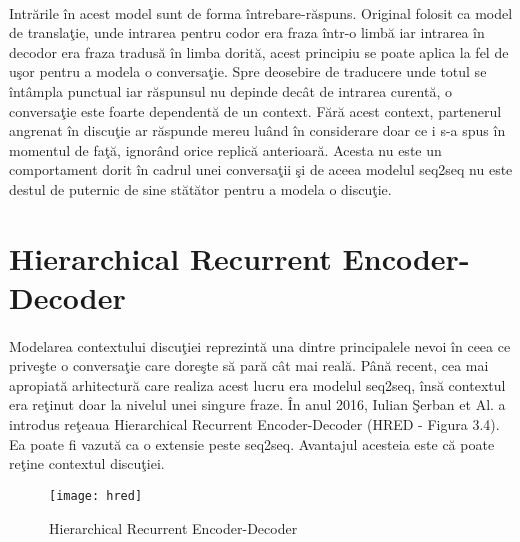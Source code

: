 \paragraph{}
Intr\u arile \^ in acest model sunt de forma \^ intrebare-r\u aspuns. Original folosit ca model de transla\c tie, unde intrarea pentru codor era fraza \^ intr-o limb\u a iar intrarea \^ in decodor era fraza tradus\u a \^ in limba dorit\u a, acest principiu se poate aplica la fel de u\c sor pentru a modela o conversa\c tie. Spre deosebire de traducere unde totul se \^ int\^ ampla punctual iar r\u aspunsul nu depinde dec\^ at de intrarea curent\u a, o conversa\c tie este foarte dependent\u a de un context. F\u ar\u a acest context, partenerul angrenat \^ in discu\c tie ar r\u aspunde mereu lu\^ and \^ in considerare doar ce i s-a spus \^ in momentul de fa\c t\u a, ignor\^ and orice replic\u a anterioar\u a. Acesta nu este un comportament dorit \^ in cadrul unei conversa\c tii \c si de aceea modelul seq2seq nu este destul de puternic de sine st\u at\u ator pentru a modela o discu\c tie.

\section{Hierarchical Recurrent Encoder-Decoder}

\paragraph{}
Modelarea contextului discu\c tiei reprezint\u a una dintre principalele nevoi \^ in ceea ce prive\c ste o conversa\c tie care dore\c ste s\u a par\u a c\^ at mai real\u a. P\^ an\u a recent, cea mai apropiat\u a arhitectur\u a care realiza acest lucru era modelul seq2seq, \^ ins\u a contextul era re\c tinut doar la nivelul unei singure fraze. \^ In anul 2016, Iulian \c Serban et Al. a introdus re\c teaua Hierarchical Recurrent Encoder-Decoder (HRED - Figura 3.4). Ea poate fi vazut\u a ca o extensie peste seq2seq. Avantajul acesteia este c\u a poate re\c tine contextul discu\c tiei.

\begin{figure}[H]
\centering
\texttt{[image: hred]}
\caption{Hierarchical Recurrent Encoder-Decoder}
\end{figure} 

